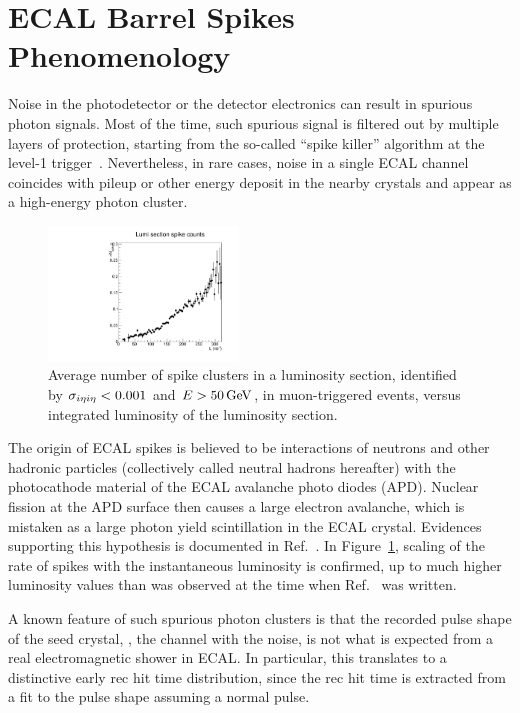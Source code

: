 \section{ECAL Barrel Spikes Phenomenology}
\label{sec:spikes}

Noise in the photodetector or the detector electronics can result in spurious photon signals. 
Most of the time, such spurious signal is filtered out by multiple layers of protection, starting from the so-called ``spike killer'' algorithm at the level-1 trigger~\cite{CMS_AN_2010-357}. 
Nevertheless, in rare cases, noise in a single ECAL channel coincides with pileup or other energy deposit in the nearby crystals and appear as a high-energy photon cluster.

\begin{figure}[tbp]
  \begin{center}
    \includegraphics[width=0.45\textwidth]{Reconstruction/Figures/spikes/spike_lumi_scaling.pdf}
    \caption{
      Average number of spike clusters in a luminosity section, identified by $\sigma_{i\eta i\eta} < 0.001$ and $E > 50\,\text{Ge\hspace{-.08em}V}$, in muon-triggered events, versus integrated luminosity of the luminosity section.
    }
    \label{fig:spike_lumi_scaling}
  \end{center}
\end{figure}

The origin of ECAL spikes is believed to be interactions of neutrons and other hadronic particles (collectively called neutral hadrons hereafter) with the photocathode material of the ECAL avalanche photo diodes (APD). 
Nuclear fission at the APD surface then causes a large electron avalanche, which is mistaken as a large photon yield scintillation in the ECAL crystal. 
Evidences supporting this hypothesis is documented in Ref.~\cite{CMS_AN_2010-357}. 
In Figure~\ref{fig:spike_lumi_scaling}, scaling of the rate of spikes with the instantaneous luminosity is confirmed, up to much higher luminosity values than was observed at the time when Ref.~\cite{CMS_AN_2010-357} was written.

A known feature of such spurious photon clusters is that the recorded pulse shape of the seed crystal, \ie, the channel with the noise, is not what is expected from a real electromagnetic shower in ECAL. 
In particular, this translates to a distinctive early rec hit time distribution, since the rec hit time is extracted from a fit to the pulse shape assuming a normal pulse.

